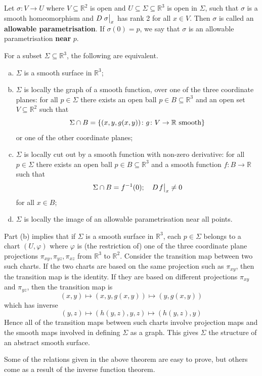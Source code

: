 \documentclass[a4paper,11pt]{article}
\begin{document}
\begin{definition}
	Let \( \sigma \colon V \to U \) where \( V \subseteq \mathbb R^2 \) is open and \( U \subseteq \Sigma \subseteq \mathbb R^3 \) is open in \( \Sigma \), such that \( \sigma \) is a smooth homeomorphism and \( D \eval{\sigma}_x \) has rank 2 for all \( x \in V \).
	Then \( \sigma \) is called an \textbf{allowable parametrisation}.
	If \( \sigma(0) = p \), we say that \( \sigma \) is an allowable parametrisation \textbf{near} \( p \).
\end{definition}
\begin{theorem}
	For a subset \( \Sigma \subseteq \mathbb R^3 \), the following are equivalent.
	\begin{enumerate}[(a)]
		\item \( \Sigma \) is a smooth surface in \( \mathbb R^3 \);
		\item \( \Sigma \) is locally the graph of a smooth function, over one of the three coordinate planes: for all \( p \in \Sigma \) there exists an open ball \( p \in B \subseteq \mathbb R^3 \) and an open set \( V \subseteq \mathbb R^2 \) such that
		      \[
			      \Sigma \cap B = \qty{(x, y, g(x,y)) \colon g \colon V \to \mathbb R \text{ smooth}}
		      \]
		      or one of the other coordinate planes;
		\item \( \Sigma \) is locally cut out by a smooth function with non-zero derivative: for all \( p \in \Sigma \) there exists an open ball \( p \in B \subseteq \mathbb R^3 \) and a smooth function \( f \colon B \to \mathbb R \) such that
		      \[
			      \Sigma \cap B = f^{-1}(0);\quad D \teval{f}{x} \neq 0
		      \]
		      for all \( x \in B \);
		\item \( \Sigma \) is locally the image of an allowable parametrisation near all points.
	\end{enumerate}
\end{theorem}
\begin{remark}
	Part (b) implies that if \( \Sigma \) is a smooth surface in \( \mathbb R^3 \), each \( p \in \Sigma \) belongs to a chart \( (U, \varphi) \) where \( \varphi \) is (the restriction of) one of the three coordinate plane projections \( \pi_{xy}, \pi_{yz}, \pi_{xz} \) from \( \mathbb R^3 \) to \( \mathbb R^2 \).
	Consider the transition map between two such charts.
	If the two charts are based on the same projection such as \( \pi_{xy} \), then the transition map is the identity.
	If they are based on different projections \( \pi_{xy} \) and \( \pi_{yz} \), then the transition map is
	\[
		(x,y) \mapsto (x,y,g(x,y)) \mapsto (y,g(x,y))
	\]
	which has inverse
	\[
		(y,z) \mapsto (h(y,z),y,z) \mapsto (h(y,z),y)
	\]
	Hence all of the transition maps between such charts involve projection maps and the smooth maps involved in defining \( \Sigma \) as a graph.
	This gives \( \Sigma \) the structure of an abstract smooth surface.
\end{remark}
Some of the relations given in the above theorem are easy to prove, but others come as a result of the inverse function theorem.
\end{document}
